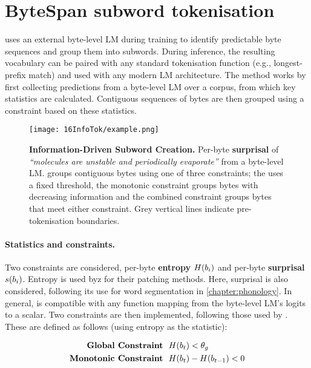 \section{ByteSpan subword tokenisation}\label{sec:16-bytespan}

\bytespan uses an external byte-level LM during training to identify predictable byte sequences and group them into subwords. During inference, the resulting vocabulary can be paired with any standard tokenisation function (e.g., longest-prefix match) and used with any modern LM architecture. %
The method works by first collecting predictions from a byte-level LM over a corpus, from which key statistics are calculated. Contiguous sequences of bytes are then grouped using a constraint based on these statistics.

\begin{figure}[!t]
    \centering
    \texttt{[image: 16InfoTok/example.png]}
    \caption{\textbf{Information-Driven Subword Creation.}
    Per-byte \textbf{surprisal} of \textit{\enquote{molecules are unstable and periodically evaporate}} from a byte-level LM. \bytespan groups contiguous bytes using one of three constraints; the  uses a fixed threshold, the monotonic constraint groups bytes with decreasing information and the combined constraint groups bytes that meet either constraint. Grey vertical lines indicate pre-tokenisation boundaries.
    }
    \label{fig:16-example}
\end{figure}

\paragraph{Statistics and constraints.} Two constraints are considered, per-byte \textbf{entropy} \(H(b_i)\) and per-byte \textbf{surprisal} \(s(b_i)\). Entropy is used byz \citet{pagnoni2024byte} for their patching methods. Here, surprisal is also considered, following its use for word segmentation in \cref{chapter:phonology}. In general, \bytespan is compatible with any function mapping from the byte-level LM's logits to a scalar. Two constraints are then implemented, following those used by \citet{pagnoni2024byte}. These are defined as follows (using entropy as the statistic):

\begin{align}
    \mathrm{\textbf{Global~Constraint}} &~~ H(b_t) < \theta_g \\
    \mathrm{\textbf{Monotonic~Constraint}} &~~ H(b_t) - H(b_{t-1}) < 0 
\end{align}

